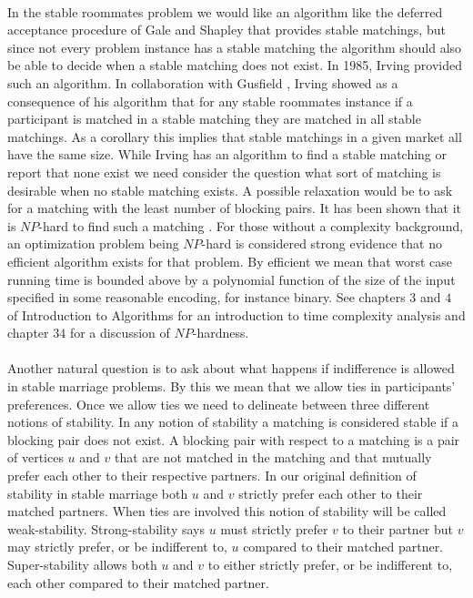 \paragraph{}
In the stable roommates problem we would like an algorithm like the deferred acceptance procedure of Gale and Shapley that provides stable matchings, but since not every problem instance has a stable matching the algorithm should also be able to decide when a stable matching does not exist. In 1985, Irving \cite{irving1985efficient} provided such an algorithm. In collaboration with Gusfield \cite{irving1987efficient}, Irving showed as a consequence of his algorithm that for any stable roommates instance if a participant is matched in a stable matching they are matched in all stable matchings. As a corollary this implies that stable matchings in a given market all have the same size. While Irving has an algorithm to find a stable matching or report that none exist we need consider the question what sort of matching is desirable when no stable matching exists. A possible relaxation would be to ask for a matching with the least number of blocking pairs. It has been shown that it is $NP$-hard to find such a matching \cite{abraham2005almost}. For those without a complexity background, an optimization problem being $NP$-hard is considered strong evidence that no efficient algorithm exists for that problem. By efficient we mean that worst case running time is bounded above by a polynomial function of the size of the input specified in some reasonable encoding, for instance binary. See chapters $3$ and $4$ of Introduction to Algorithms \cite{cormen2009introduction} for an introduction to time complexity analysis and chapter $34$ for a discussion of $NP$-hardness.
\paragraph{}
Another natural question is to ask about what happens if indifference is allowed in stable marriage problems. By this we mean that we allow ties in participants' preferences. Once we allow ties we need to delineate between three different notions of stability. In any notion of stability a matching is considered stable if a blocking pair does not exist. A blocking pair with respect to a matching is a pair of vertices $u$ and $v$ that are not matched in the matching and that mutually prefer each other to their respective partners. In our original definition of stability in stable marriage both $u$ and $v$ strictly prefer each other to their matched partners. When ties are involved this notion of stability will be called weak-stability. Strong-stability says $u$ must strictly prefer $v$ to their partner but $v$ may strictly prefer, or be indifferent to, $u$ compared to their matched partner. Super-stability allows both $u$ and $v$ to either strictly prefer, or be indifferent to, each other compared to their matched partner.

